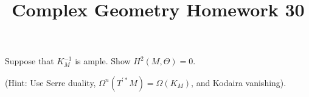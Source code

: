\documentclass[12pt]{article}
\title{Complex Geometry Homework 30}
\author{}
\date{}
\begin{document}
\maketitle
\begin{problem}
  Suppose that \(K_M^{-1}\) is ample. Show \(H^2(M,\Theta)=0\).

  (Hint: Use Serre duality, \(\Omega^n(T^{\prime*}M)=\Omega(K_M)\), and
  Kodaira vanishing).
\end{problem}
\end{document}
